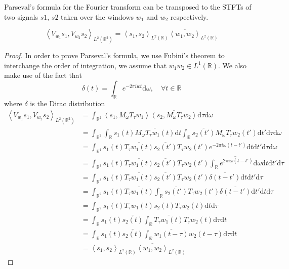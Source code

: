 \documentclass[american,]{article}
\theoremstyle{definition}
\theoremstyle{definition}
\theoremstyle{definition}
\theoremstyle{remark}
\begin{document}
Parseval's formula for the Fourier transform can be transposed
to the STFTs of two signals \(s1\), \(s2\) taken over the windows \(w_1\) and \(w_2\) respectively.

\begin{equation}
\left\langle V_{w_1}s_1,V_{w_2}s_2\right\rangle_{L^2(\mathbb{R}^2)} =
    \left\langle s_1,s_2\right\rangle_{L^2(\mathbb{R})} \overline{\left\langle w_1,w_2\right\rangle}_{L^2(\mathbb{R})}
\end{equation}

\begin{proof}
In order to prove Parseval's formula, we use Fubini's theorem
to interchange the order of integration, we assume that $\overline{w_1}w_2\in L^1(\mathbb{R})$.
We also make use of the fact that
\begin{equation}
\delta(t)=\int_\mathbb{R}e^{-2\pi iwt}\mathrm{d}\omega,\quad\forall t\in\mathbb{R}
\end{equation}
where $\delta$ is the Dirac distribution
\begin{align}
\left\langle V_{w_1}s_1,V_{w_2}s_2\right\rangle_{L^2(\mathbb{R}^2)}
&= \int_{\mathbb{R}^2} \left\langle s_1,M_\omega T_\tau w_1\right\rangle \overline{\left\langle s_2,M_\omega T_\tau w_2\right\rangle} \mathrm{d}\tau\mathrm{d}\omega\\
&= \int_{\mathbb{R}^2} \int_\mathbb{R}s_1(t)\overline{M_\omega T_\tau w_1(t)}\mathrm{d}t
               \int_\mathbb{R}\overline{s_2(t')} M_\omega T_\tau w_2(t') \mathrm{d}t' \mathrm{d}\tau\mathrm{d}\omega\\
&= \int_{\mathbb{R}^4} s_1(t)\overline{T_\tau w_1(t)}
    \overline{s_2(t')} T_\tau w_2(t') e^{-2\pi i\omega(t-t')} \mathrm{d}t\mathrm{d}t'\mathrm{d}\tau\mathrm{d}\omega\\
&= \int_{\mathbb{R}^3} s_1(t)\overline{T_\tau w_1(t)} \overline{s_2(t')} T_\tau w_2(t')
    \overline{\int_\mathbb{R}e^{2\pi i\omega(t-t')}\mathrm{d}\omega} \mathrm{d}t\mathrm{d}t'\mathrm{d}\tau\\
&= \int_{\mathbb{R}^3} s_1(t)\overline{T_\tau w_1(t)} \overline{s_2(t')} T_\tau w_2(t')
    \overline{\delta(t-t')} \mathrm{d}t\mathrm{d}t'\mathrm{d}\tau\\
&= \int_{\mathbb{R}^2} s_1(t)\overline{T_\tau w_1(t)}
    \int_\mathbb{R}\overline{s_2(t')} T_\tau w_2(t') \overline{\delta(t-t')}\mathrm{d}t'\mathrm{d}t\mathrm{d}\tau\\
&= \int_{\mathbb{R}^2} s_1(t)\overline{T_\tau w_1(t)} \overline{s_2(t)} T_\tau w_2(t)\mathrm{d}t\mathrm{d}\tau\\
&= \int_\mathbb{R}s_1(t)\overline{s_2(t)} \int_\mathbb{R}\overline{T_\tau w_1(t)} T_\tau w_2(t)\mathrm{d}\tau\mathrm{d}t\\
&= \int_\mathbb{R}s_1(t)\overline{s_2(t)} \int_\mathbb{R}\overline{w_1(t-\tau)} w_2(t-\tau)\mathrm{d}\tau\mathrm{d}t\\
&= \left\langle s_1,s_2\right\rangle_{L^2(\mathbb{R})} \overline{\left\langle w_1,w_2\right\rangle}_{L^2(\mathbb{R})}
\end{align}
\end{proof}
\end{document}
